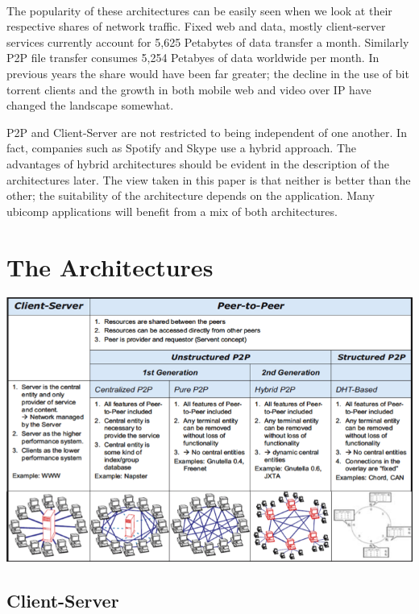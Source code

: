 \documentclass[11pt]{amsart}
\begin{document}
\paragraph{}
The popularity of these architectures can be easily seen when we look at their respective shares of network traffic.  
Fixed web and data, mostly client-server services currently account for 5,625 Petabytes of data transfer a month. Similarly P2P file transfer consumes 5,254 Petabyes of data worldwide per month.\cite{Cisco} In previous years the share would have been far greater; the decline in the use of bit torrent clients and the growth in both mobile web and video over IP have changed the landscape somewhat.

P2P and Client-Server are not restricted to being independent of one another. In fact, companies such as Spotify and Skype use a hybrid approach. The advantages of hybrid architectures should be evident in the description of the architectures later. The view taken in this paper is that neither is better than the other; the suitability of the architecture depends on the application. Many ubicomp applications will benefit from a mix of both architectures.

\section{The Architectures}

\includegraphics[scale=.5]{Architectures}\cite{DistSys}

\subsection{Client-Server}
\end{document}
